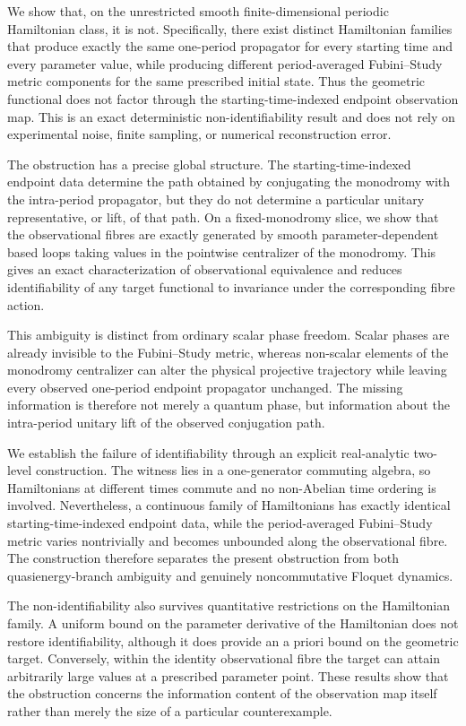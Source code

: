 \documentclass[twocolumn,prl,aps,floatfix]{revtex4-2}
\begin{document}
We show that, on the unrestricted smooth finite-dimensional periodic Hamiltonian class, it is not. Specifically, there exist distinct Hamiltonian families that produce exactly the same one-period propagator for every starting time and every parameter value, while producing different period-averaged Fubini--Study metric components for the same prescribed initial state. Thus the geometric functional does not factor through the starting-time-indexed endpoint observation map. This is an exact deterministic non-identifiability result and does not rely on experimental noise, finite sampling, or numerical reconstruction error.

The obstruction has a precise global structure. The starting-time-indexed endpoint data determine the path obtained by conjugating the monodromy with the intra-period propagator, but they do not determine a particular unitary representative, or lift, of that path. On a fixed-monodromy slice, we show that the observational fibres are exactly generated by smooth parameter-dependent based loops taking values in the pointwise centralizer of the monodromy. This gives an exact characterization of observational equivalence and reduces identifiability of any target functional to invariance under the corresponding fibre action.

This ambiguity is distinct from ordinary scalar phase freedom. Scalar phases are already invisible to the Fubini--Study metric, whereas non-scalar elements of the monodromy centralizer can alter the physical projective trajectory while leaving every observed one-period endpoint propagator unchanged. The missing information is therefore not merely a quantum phase, but information about the intra-period unitary lift of the observed conjugation path.

We establish the failure of identifiability through an explicit real-analytic two-level construction. The witness lies in a one-generator commuting algebra, so Hamiltonians at different times commute and no non-Abelian time ordering is involved. Nevertheless, a continuous family of Hamiltonians has exactly identical starting-time-indexed endpoint data, while the period-averaged Fubini--Study metric varies nontrivially and becomes unbounded along the observational fibre. The construction therefore separates the present obstruction from both quasienergy-branch ambiguity and genuinely noncommutative Floquet dynamics.

The non-identifiability also survives quantitative restrictions on the Hamiltonian family. A uniform bound on the parameter derivative of the Hamiltonian does not restore identifiability, although it does provide an a priori bound on the geometric target. Conversely, within the identity observational fibre the target can attain arbitrarily large values at a prescribed parameter point. These results show that the obstruction concerns the information content of the observation map itself rather than merely the size of a particular counterexample.
\end{document}
